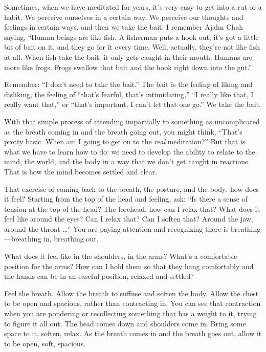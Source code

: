 Sometimes, when we have meditated for years, it’s very easy to get into
a rut or a habit. We perceive ourselves in a certain way. We perceive
our thoughts and feelings in certain ways, and then we take the bait. I
remember Ajahn Chah saying, “Human beings are like fish. A fisherman
puts a hook out; it’s got a little bit of bait on it, and they go for it
every time. Well, actually, they’re not like fish at all. When fish take
the bait, it only gets caught in their mouth. Humans are more like
frogs. Frogs swallow that bait and the hook right down into the gut.”

Remember: “I don’t need to take the bait.” The bait is the feeling of
liking and disliking, the feeling of “that’s fearful, that’s
intimidating,” “I really like that, I really want that,” or “that’s
important, I can’t let that one go.” We take the bait.

With that simple process of attending impartially to something as
uncomplicated as the breath coming in and the breath going out, you
might think, “That’s pretty basic. When am I going to get on to the
\emph{real} meditation?” But that is what we have to learn how to do: we
need to develop the ability to relate to the mind, the world, and the
body in a way that we don’t get caught in reactions. That is how the
mind becomes settled and clear.

That exercise of coming back to the breath, the posture, and the body:
how does it feel? Starting from the top of the head and feeling, ask:
“Is there a sense of tension at the top of the head? The forehead, how
can I relax that? What does it feel like around the eyes? Can I relax
that? Can I soften that? Around the jaw, around the throat \ldots{}” You are
paying attention and recognizing there is breathing—breathing in,
breathing out.

What does it feel like in the shoulders, in the arms? What’s a
comfortable position for the arms? How can I hold them so that they hang
comfortably and the hands can be in an easeful position, relaxed and
settled?

Feel the breath. Allow the breath to suffuse and soften the body. Allow
the chest to be open and spacious, rather than contracting in. You can
see that contraction when you are pondering or recollecting something
that has a weight to it, trying to figure it all out. The head comes
down and shoulders come in. Bring some space to it, soften, relax. As
the breath comes in and the breath goes out, allow it to be open, soft,
spacious.


